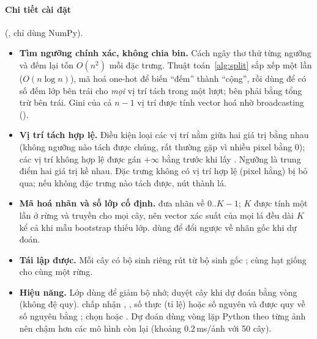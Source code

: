 \paragraph{Chi tiết cài đặt} (, chỉ dùng NumPy).
\begin{itemize}
\item \textbf{Tìm ngưỡng chính xác, không chia bin.} Cách ngây thơ thử từng ngưỡng và đếm lại tốn $O(n^2)$ mỗi đặc trưng. Thuật toán~\ref{alg:split} sắp xếp một lần ($O(n\log n)$), mã hoá one-hot để biến ``đếm'' thành ``cộng'', rồi dùng  để có số đếm lớp bên trái cho \emph{mọi} vị trí tách trong một lượt; bên phải bằng tổng trừ bên trái. Gini của cả $n-1$ vị trí được tính vector hoá nhờ broadcasting ().
\item \textbf{Vị trí tách hợp lệ.} Điều kiện  loại các vị trí nằm giữa hai giá trị bằng nhau (không ngưỡng nào tách được chúng, rất thường gặp vì nhiều pixel bằng 0); các vị trí không hợp lệ được gán $+\infty$ bằng  trước khi lấy . Ngưỡng là trung điểm hai giá trị kề nhau. Đặc trưng không có vị trí hợp lệ (pixel hằng) bị bỏ qua; nếu không đặc trưng nào tách được, nút thành lá.
\item \textbf{Mã hoá nhãn và số lớp cố định.}  đưa nhãn về $0..K{-}1$; $K$ được tính một lần ở rừng và truyền cho mọi cây, nên vector xác suất của mọi lá đều dài $K$ kể cả khi mẫu bootstrap thiếu lớp.  dùng để đổi ngược về nhãn gốc khi dự đoán.
\item \textbf{Tái lập được.} Mỗi cây có bộ sinh riêng  rút từ bộ sinh gốc ; cùng hạt giống cho cùng một rừng.
\item \textbf{Hiệu năng.} Lớp  dùng  để giảm bộ nhớ; duyệt cây khi dự đoán bằng vòng  (không đệ quy).  chấp nhận , , số thực (tỉ lệ) hoặc số nguyên và được quy về số nguyên bằng ;  chọn  hoặc . Dự đoán dùng vòng lặp Python theo từng ảnh nên chậm hơn các mô hình còn lại (khoảng 0.2\,ms/ảnh với 50 cây).
\end{itemize}
 
